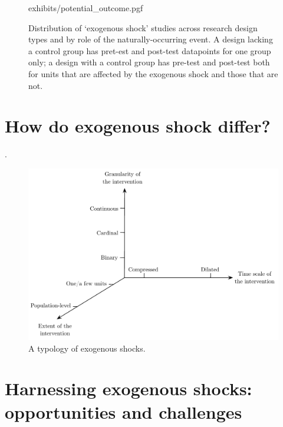 \begin{refsection}
\clearpage

\begin{figure}
  \raggedleft
  \begin{small}
      {exhibits/potential_outcome.pgf}
    \caption{Distribution of `exogenous shock' studies across research 
    design types and by role of the naturally-occurring event. A design 
    lacking a control group has pret-est and post-test datapoints for 
    one group only; a design with a control group has pre-test and 
    post-test both for units that are affected by the exogenous shock and 
    those that are not.}
    \label{fig:potential_outcome}
  \end{small}
\end{figure}


\section{How do exogenous shock differ?}
\label{sec:how_exogenous_shocks_differ}

.

\begin{figure}[!htbp]
    \begin{center}
      \includegraphics[width=1\textwidth]{exhibits/typology.pdf}
    \end{center}
    \caption{A typology of exogenous shocks.}
    \label{fig:typology}
\end{figure}


\section{Harnessing exogenous shocks: opportunities and challenges}
\label{sec:harnessing_exogenous_shocks}


\end{refsection}
